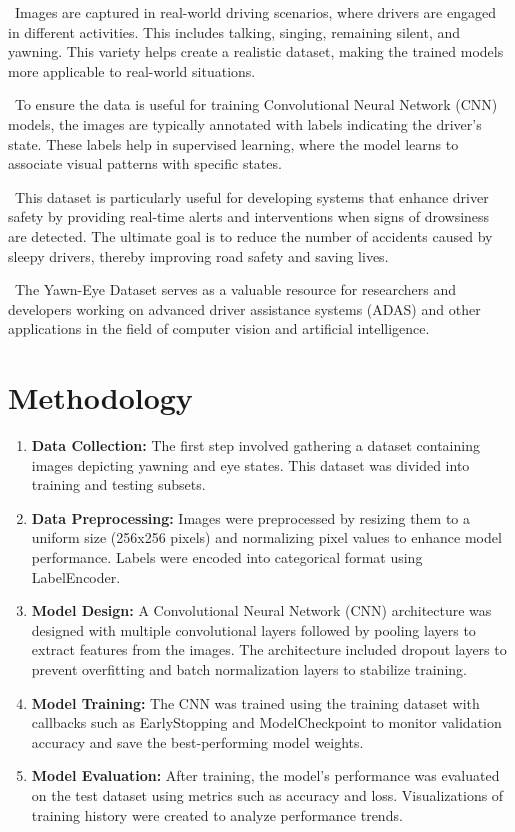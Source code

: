 \documentclass[conference]{IEEEtran}
\begin{document}
\ Images are captured in real-world driving scenarios, where drivers are engaged in different activities. This includes talking, singing, remaining silent, and yawning. This variety helps create a realistic dataset, making the trained models more applicable to real-world situations.

\ To ensure the data is useful for training Convolutional Neural Network (CNN) models, the images are typically annotated with labels indicating the driver's state. These labels help in supervised learning, where the model learns to associate visual patterns with specific states.

\ This dataset is particularly useful for developing systems that enhance driver safety by providing real-time alerts and interventions when signs of drowsiness are detected. The ultimate goal is to reduce the number of accidents caused by sleepy drivers, thereby improving road safety and saving lives.

\ The Yawn-Eye Dataset serves as a valuable resource for researchers and developers working on advanced driver assistance systems (ADAS) and other applications in the field of computer vision and artificial intelligence.

\section{Methodology}

\begin{enumerate}
    \item \textbf{Data Collection:} The first step involved gathering a dataset containing images depicting yawning and eye states. This dataset was divided into training and testing subsets.
    
    \item \textbf{Data Preprocessing:} Images were preprocessed by resizing them to a uniform size (256x256 pixels) and normalizing pixel values to enhance model performance. Labels were encoded into categorical format using LabelEncoder.
    
    \item \textbf{Model Design:} A Convolutional Neural Network (CNN) architecture was designed with multiple convolutional layers followed by pooling layers to extract features from the images. The architecture included dropout layers to prevent overfitting and batch normalization layers to stabilize training.
    
    \item \textbf{Model Training:} The CNN was trained using the training dataset with callbacks such as EarlyStopping and ModelCheckpoint to monitor validation accuracy and save the best-performing model weights.
    
    \item \textbf{Model Evaluation:} After training, the model's performance was evaluated on the test dataset using metrics such as accuracy and loss. Visualizations of training history were created to analyze performance trends.
\end{enumerate}
\end{document}

